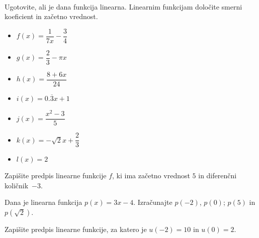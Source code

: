                 ~\\

        
            \begin{naloga}
                Ugotovite, ali je dana funkcija linearna. Linearnim funkcijam določite smerni koeficient in začetno vrednost.
                \begin{multicols}{2}
                \begin{itemize}
                        \item $f(x)=\dfrac{1}{7x}-\dfrac{3}{4}$ 
                        \item $g(x)=\dfrac{2}{3}-\pi x$ 
                        \item $h(x)=\dfrac{8+6x}{24}$ 
                        \item $i(x)=0.\overline{3}x+1$ 
                        \item $j(x)=\dfrac{x^2-3}{5}$ 
                        \item $k(x)=-\sqrt{2}x+\dfrac{2}{3}$ 
                        \item $l(x)=2$ 
                    \end{itemize}
                \end{multicols}
            \end{naloga}
        



        
            \begin{naloga}
                Zapišite predpis linearne funkcije $f$, ki ima začetno vrednost $5$ in diferenčni količnik~$-3$. 
            \end{naloga}

            \begin{naloga}
                Dana je linearna funkcija $p(x)=3x-4$. Izračunajte $p(-2)$, $p(0)$; $p(5)$ in $p(\sqrt{2})$. 
            \end{naloga}

            \begin{naloga}
                Zapišite predpis linearne funkcije, za katero je $u(-2)=10$ in $u(0)=2$. 
            \end{naloga}

        


